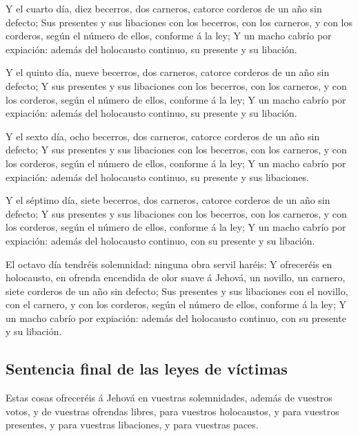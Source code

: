  Y el cuarto día, diez becerros, dos carneros, catorce
corderos de un año sin defecto;  Sus presentes y sus
libaciones con los becerros, con los carneros, y con los corderos, según
el número de ellos, conforme á la ley;  Y un macho cabrío
por expiación: además del holocausto continuo, su presente y su
libación.

 Y el quinto día, nueve becerros, dos carneros, catorce
corderos de un año sin defecto;  Y sus presentes y sus
libaciones con los becerros, con los carneros, y con los corderos, según
el número de ellos, conforme á la ley;  Y un macho cabrío
por expiación: además del holocausto continuo, su presente y su
libación.

 Y el sexto día, ocho becerros, dos carneros, catorce
corderos de un año sin defecto;  Y sus presentes y sus
libaciones con los becerros, con los carneros, y con los corderos, según
el número de ellos, conforme á la ley;  Y un macho cabrío
por expiación: además del holocausto continuo, su presente y sus
libaciones.

 Y el séptimo día, siete becerros, dos carneros, catorce
corderos de un año sin defecto;  Y sus presentes y sus
libaciones con los becerros, con los carneros, y con los corderos, según
el número de ellos, conforme á la ley;  Y un macho cabrío
por expiación: además del holocausto continuo, con su presente y su
libación.

 El octavo día tendréis solemnidad: ninguna obra servil
haréis:  Y ofreceréis en holocausto, en ofrenda encendida
de olor suave á Jehová, un novillo, un carnero, siete corderos de un año
sin defecto;  Sus presentes y sus libaciones con el
novillo, con el carnero, y con los corderos, según el número de ellos,
conforme á la ley;  Y un macho cabrío por expiación:
además del holocausto continuo, con su presente y su libación.

\hypertarget{sentencia-final-de-las-leyes-de-vuxedctimas}{%
\subsection{Sentencia final de las leyes de
víctimas}\label{sentencia-final-de-las-leyes-de-vuxedctimas}}

 Estas cosas ofreceréis á Jehová en vuestras
solemnidades, además de vuestros votos, y de vuestras ofrendas libres,
para vuestros holocaustos, y para vuestros presentes, y para vuestras
libaciones, y para vuestras paces. 


